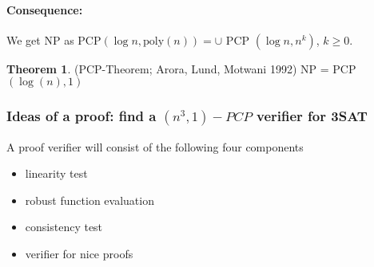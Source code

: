 \documentclass[11pt]{article}
\theoremstyle{definition}
\newtheorem{theorem}{Theorem}[section]
\theoremstyle{definition}
\begin{document}
\paragraph{Consequence:} We get NP as PCP$(\log n, \text{poly}(n)) = \cup $ PCP $(\log n, n^k)$, $ k \geq 0 $.

\begin{theorem} (PCP-Theorem; Arora, Lund, Motwani 1992)
NP = PCP$(\log(n), 1)$
\end{theorem} 

\subsubsection*{Ideas of a proof: find a $ (n^3, 1)-PCP $ verifier for 3SAT}

A proof verifier will consist of the following four components
	\begin{itemize}
	\item linearity test
	\item robust function evaluation
	\item consistency test
	\item verifier for nice proofs
	\end{itemize}
\end{document}
